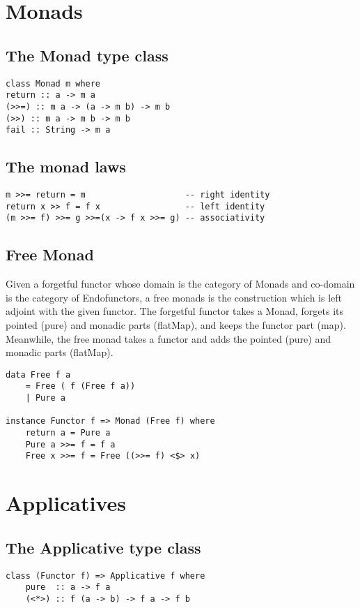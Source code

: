 \documentclass[12pt,twoside]{report}
\begin{document}
\section{Monads}
\subsection{The Monad type class}
\begin{verbatim}
class Monad m where
return :: a -> m a
(>>=) :: m a -> (a -> m b) -> m b
(>>) :: m a -> m b -> m b
fail :: String -> m a
\end{verbatim}

\subsection{The monad laws}
\begin{verbatim}
m >>= return = m                    -- right identity
return x >> f = f x                 -- left identity
(m >>= f) >>= g >>=(x -> f x >>= g) -- associativity
\end{verbatim}

\subsection{Free Monad}
Given a forgetful functor whose domain is the category of Monads and co-domain is the category of Endofunctors, a free monads is the construction which is left adjoint with the given functor. The forgetful functor takes a Monad, forgets its pointed (pure) and monadic parts (flatMap), and keeps the functor part (map). Meanwhile, the free monad takes a functor and adds the pointed (pure) and monadic parts (flatMap).
\begin{verbatim}
data Free f a
    = Free ( f (Free f a))
    | Pure a

instance Functor f => Monad (Free f) where
    return a = Pure a
    Pure a >>= f = f a
    Free x >>= f = Free ((>>= f) <$> x)
\end{verbatim}

\section{Applicatives}
\subsection{The Applicative type class}
\begin{verbatim}
class (Functor f) => Applicative f where
    pure  :: a -> f a
    (<*>) :: f (a -> b) -> f a -> f b
\end{verbatim}
\end{document}
